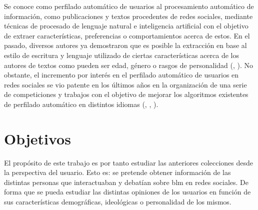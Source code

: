 Se conoce como perfilado automático de usuarios al procesamiento automático de información, como publicaciones y textos procedentes de redes sociales, mediante técnicas de procesado de lenguaje natural e inteligencia artificial con el objetivo de extraer características, preferencias o comportamientos acerca de estos. En el pasado, diversos autores ya demostraron que es posible la extracción en base al estilo de escritura y lenguaje utilizado de ciertas características acerca de los autores de textos como pueden ser edad, género o rasgos de personalidad (\cite{personality_profiling}, \cite{words-nerds}). No obstante, el incremento por interés en el perfilado automático de usuarios en redes sociales se vio patente en los últimos años en la organización de una serie de competiciones y trabajos con el objetivo de mejorar los algoritmos existentes de perfilado automático en distintos idiomas (\cite{pan:2015}, \cite{iberlef2022}, \cite{profiling_urdu}).\\

\section{Objetivos}
El propósito de este trabajo es por tanto estudiar las anteriores colecciones desde la perspectiva del usuario. Esto es: se pretende obtener información de las distintas personas que interactuaban y debatían sobre \acrshort{blm} en redes sociales. De forma que se pueda estudiar las distintas opiniones de los usuarios en función de sus características demográficas, ideológicas o personalidad de los mismos.

